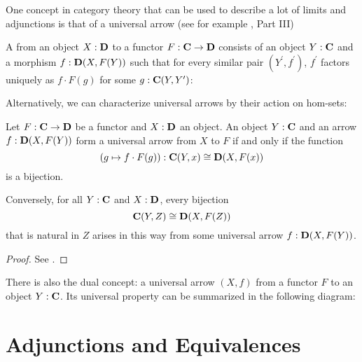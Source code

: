 One concept in category theory that can be used to describe a lot of limits and adjunctions is that of a universal arrow (see for example \autocite{MacLane}, Part III)
\begin{definition}
  A  from an object $ X: \mathbf{D} $ to a functor $ F: \mathbf{C} \to \mathbf{D} $ consists of an object $ Y: \mathbf{C} $ and a morphism $ f: \mathbf{D}(X, F(Y)) $ such that for every similar pair $ (Y^\prime, f^\prime) $, $ f^\prime $ factors uniquely as $ f \cdot F(g) $ for some $ g: \mathbf{C}(Y, Y^\prime) $:
  \begin{center}
  \end{center}
\end{definition}

Alternatively, we can characterize universal arrows by their action on hom-sets:
\begin{lemma}
  Let $ F: \mathbf{C} \to \mathbf{D} $ be a functor and $ X: \mathbf{D} $ an object. An object $ Y: \mathbf{C} $ and an arrow $ f: \mathbf{D}(X, F(Y)) $ form a universal arrow from $ X $ to $ F $ if and only if the function
  \[ (g \mapsto f \cdot F(g)) : \mathbf{C}(Y, x) \cong \mathbf{D}(X, F(x)) \]
  is a bijection.

  Conversely, for all $ Y: \mathbf{C} $ and $ X: \mathbf{D} $, every bijection
  \[ \mathbf{C}(Y, Z) \cong \mathbf{D}(X, F(Z)) \]
  that is natural in $ Z $ arises in this way from some universal arrow $ f: \mathbf{D}(X, F(Y)) $.
\end{lemma}
\begin{proof}
  See \autocite[][Chapter III.2, Proposition 1]{MacLane}.
\end{proof}

There is also the dual concept: a universal arrow $ (X, f) $ from a functor $ F $ to an object $ Y: \mathbf{C} $. Its universal property can be summarized in the following diagram:
\begin{center}
\end{center}

\section{Adjunctions and Equivalences}

